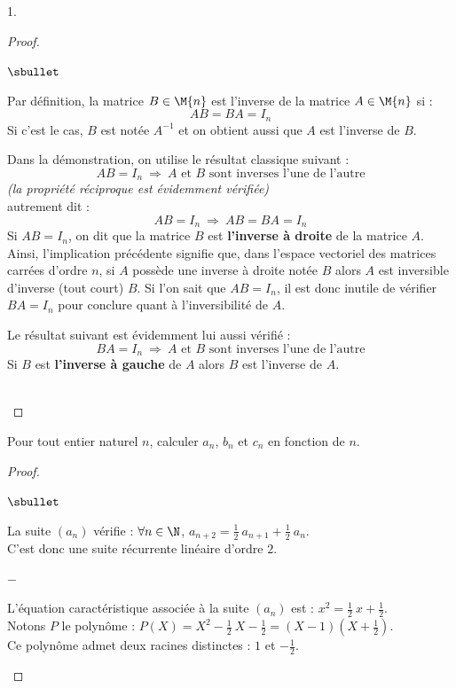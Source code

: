 \documentclass[11pt]{article}%
\begin{document}
\begin{noliste}{1.}
\begin{proof}
    \newpage


    \begin{remarkL}{.98}%
      \begin{noliste}{$\sbullet$}
      \item Par définition, la matrice $B \in \M{n}$ est l'inverse de
        la matrice $A \in \M{n}$ si :
        \[
        AB = BA = I_n
        \]
        Si c'est le cas, $B$ est notée $A^{-1}$ et on obtient aussi
        que $A$ est l'inverse de $B$.
      \item Dans la démonstration, on utilise le résultat classique
        suivant :
        \[
        AB = I_n \ \Rightarrow \ \text{$A$ et $B$ sont inverses
          l'une de l'autre}
        \]
        {\it (la propriété réciproque est évidemment vérifiée)}\\
        autrement dit :
        \[
        AB = I_n \ \Rightarrow \ AB = BA = I_n
        \]          
        Si $AB = I_n$, on dit que la matrice $B$ est {\bf l'inverse à
          droite} de la matrice $A$. Ainsi, l'implication précédente
        signifie que, dans l'espace vectoriel des matrices carrées
        d'ordre $n$, si $A$ possède une inverse à droite notée $B$
        alors $A$ est inversible d'inverse (tout court) $B$. Si l'on
        sait que $AB = I_n$, il est donc inutile de vérifier $BA =
        I_n$ pour conclure quant à l'inversibilité de $A$.
          
      \item Le résultat suivant est évidemment lui aussi vérifié :
        \[
        BA = I_n \ \Rightarrow \ \text{$A$ et $B$ sont inverses
          l'une de l'autre}
        \]
        Si $B$ est {\bf l'inverse à gauche} de $A$ alors $B$ est
        l'inverse de $A$.
      \end{noliste}
    \end{remarkL}~\\[-1.2cm]
  \end{proof}

\item Pour tout entier naturel $n$, calculer $a_{n}$, $b_{n}$ et
  $c_{n}$ en fonction de $n$.

  \begin{proof}~%
    \begin{noliste}{$\sbullet$}
    \item La suite $(a_n)$ vérifie : $\forall n \in \N$, $a_{n+2} =
      \frac{1}{2} \ a_{n+1} + \frac{1}{2} \ a_n$.\\[.1cm]
      C'est donc une suite récurrente linéaire d'ordre $2$.
      \begin{noliste}{$-$}
      \item L'équation caractéristique associée à la suite $(a_n)$ est
        : $x^2 = \frac{1}{2} \ x + \frac{1}{2}$.\\[.1cm]
        Notons $P$ le polynôme : $P(X) = X^2 - \frac{1}{2} \ X -
        \frac{1}{2} = (X - 1)(X + \frac{1}{2})$.\\[.1cm]
        Ce polynôme admet deux racines distinctes : $1$ et
        $-\frac{1}{2}$.


\end{noliste}
\end{noliste}
\end{proof}
\end{noliste}
\end{document}
